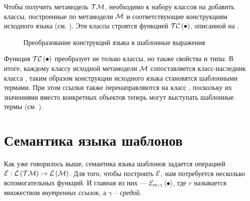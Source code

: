 Чтобы получить метамодель $\mathcal{TM}$, необходимо к набору классов на  добавить классы, построенные по метамодели $\mathcal{M}$ и соответствующие конструкциям исходного языка (см. ). Эти классы строятся функцией $\mathcal{TC}\left(\bullet\right)$, описанной на .
%
\begin{figure}[htbp]
	\centering
{}
	\caption{Преобразование конструкций языка в шаблонные выражения}\label{TC}
\end{figure}
%
Функция $\mathcal{TC}\left(\bullet\right)$ преобразует не только классы, но также свойства и типы. В итоге, каждому классу исходной метамодели $\mathcal{M}$ сопоставляется класс-наследник класса , таким образом конструкции исходного языка становятся шаблонными термами. При этом ссылки также перенаправляются на класс , поскольку их значениями вместо конкретных объектов теперь могут выступать шаблонные термы (см. ).

\section{Семантика языка шаблонов}

Как уже говорилось выше, семантика языка шаблонов задается операцией  $\mathcal{E} : \mathcal{L}\left(\mathcal{TM}\right) \rightarrow \mathcal{L}\left(\mathcal{M}\right)$. Для того, чтобы построить $\mathcal{E}$, нам потребуется несколько вспомогательных функций. И главная из них --- $\mathcal{E}_{m, \gamma} \left\langle \bullet \right\rangle$, где $r$ называется множеством \emph{внутренних ссылок}, а $\gamma$ -- \emph{средой}.

